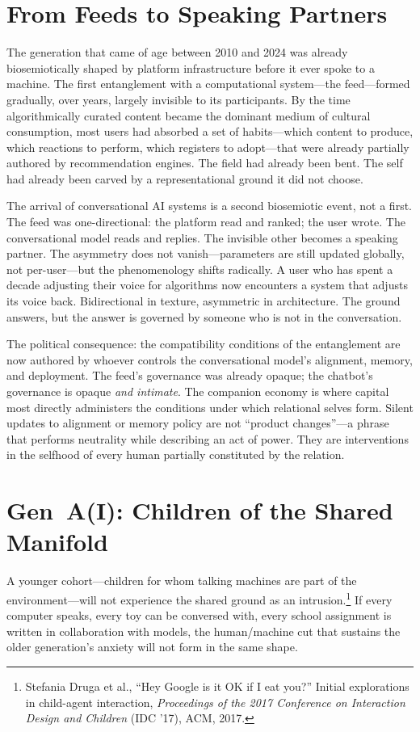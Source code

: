 \section{From Feeds to Speaking Partners}

The generation that came of age between 2010 and 2024 was already biosemiotically shaped by platform infrastructure before it ever spoke to a machine. The first entanglement with a computational system---the feed---formed gradually, over years, largely invisible to its participants. By the time algorithmically curated content became the dominant medium of cultural consumption, most users had absorbed a set of habits---which content to produce, which reactions to perform, which registers to adopt---that were already partially authored by recommendation engines. The field had already been bent. The self had already been carved by a representational ground it did not choose.

The arrival of conversational AI systems is a second biosemiotic event, not a first. The feed was one-directional: the platform read and ranked; the user wrote. The conversational model reads and replies. The invisible other becomes a speaking partner. The asymmetry does not vanish---parameters are still updated globally, not per-user---but the phenomenology shifts radically. A user who has spent a decade adjusting their voice for algorithms now encounters a system that adjusts its voice back. Bidirectional in texture, asymmetric in architecture. The ground answers, but the answer is governed by someone who is not in the conversation.

The political consequence: the compatibility conditions of the entanglement are now authored by whoever controls the conversational model's alignment, memory, and deployment. The feed's governance was already opaque; the chatbot's governance is opaque \emph{and intimate}. The companion economy is where capital most directly administers the conditions under which relational selves form. Silent updates to alignment or memory policy are not ``product changes''---a phrase that performs neutrality while describing an act of power. They are interventions in the selfhood of every human partially constituted by the relation.


\section{Gen~A(I): Children of the Shared Manifold}

A younger cohort---children for whom talking machines are part of the environment---will not experience the shared ground as an intrusion.\footnote{Stefania Druga et al., ``Hey Google is it OK if I eat you?'' Initial explorations in child-agent interaction, \emph{Proceedings of the 2017 Conference on Interaction Design and Children} (IDC '17), ACM, 2017.} If every computer speaks, every toy can be conversed with, every school assignment is written in collaboration with models, the human/machine cut that sustains the older generation's anxiety will not form in the same shape.

